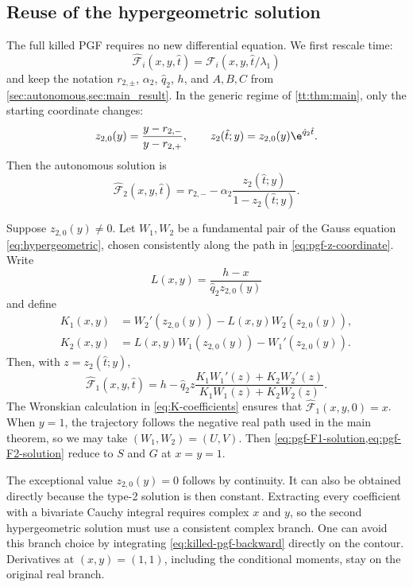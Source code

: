 \subsection{Reuse of the hypergeometric solution}

The full killed PGF requires no new differential equation. We first rescale time:
\[
\widehat{\mathcal F}_i(x,y,\hat t)
=\mathcal F_i(x,y,\hat t/\lambda_1)
\]
and keep the notation $r_{2,\pm}$, $\alpha_2$, $\hat q_2$, $h$, and $A,B,C$ from \cref{sec:autonomous,sec:main_result}. In the generic regime of \cref{tt:thm:main}, only the starting coordinate changes:
\begin{equation}
\label{eq:pgf-z-coordinate}
z_{2,0}(y)=\frac{y-r_{2,-}}{y-r_{2,+}},
\qquad
z_2(\hat t;y)=z_{2,0}(y)\e^{\hat q_2\hat t}.
\end{equation}
Then the autonomous solution is
\begin{equation}
\label{eq:pgf-F2-solution}
\widehat{\mathcal F}_2(x,y,\hat t)
=r_{2,-}-\alpha_2
\frac{z_2(\hat t;y)}{1-z_2(\hat t;y)}.
\end{equation}

Suppose $z_{2,0}(y)\neq0$. Let $W_1,W_2$ be a fundamental pair of the Gauss equation \eqref{eq:hypergeometric}, chosen consistently along the path in \cref{eq:pgf-z-coordinate}. Write
\begin{equation*}
L(x,y)=\frac{h-x}{\hat q_2z_{2,0}(y)}
\end{equation*}
and define
\begin{align*}
K_1(x,y)
&=W_2'(z_{2,0}(y))
-L(x,y)W_2(z_{2,0}(y)),\\
K_2(x,y)
&=L(x,y)W_1(z_{2,0}(y))
-W_1'(z_{2,0}(y)).
\end{align*}
Then, with $z=z_2(\hat t;y)$,
\begin{equation}
\boxed{
\widehat{\mathcal F}_1(x,y,\hat t)
=h-\hat q_2z
\frac{K_1W_1'(z)+K_2W_2'(z)}
{K_1W_1(z)+K_2W_2(z)}.}
\label{eq:pgf-F1-solution}
\end{equation}
The Wronskian calculation in \cref{eq:K-coefficients} ensures that $\widehat{\mathcal F}_1(x,y,0)=x$. When $y=1$, the trajectory follows the negative real path used in the main theorem, so we may take $(W_1,W_2)=(U,V)$. Then \cref{eq:pgf-F1-solution,eq:pgf-F2-solution} reduce to $S$ and $G$ at $x=y=1$.

The exceptional value $z_{2,0}(y)=0$ follows by continuity. It can also be obtained directly because the type-2 solution is then constant. Extracting every coefficient with a bivariate Cauchy integral requires complex $x$ and $y$, so the second hypergeometric solution must use a consistent complex branch. One can avoid this branch choice by integrating \cref{eq:killed-pgf-backward} directly on the contour. Derivatives at $(x,y)=(1,1)$, including the conditional moments, stay on the original real branch.

